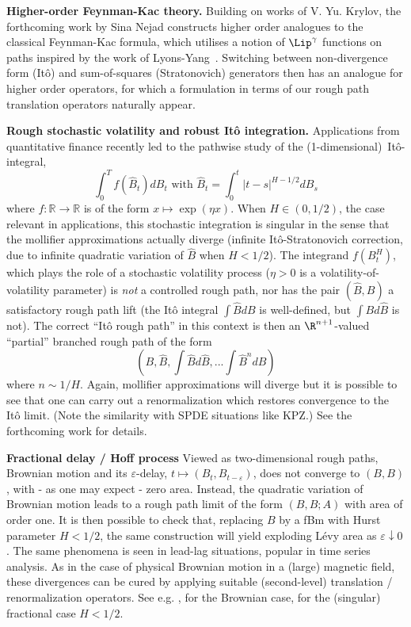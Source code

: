 \documentclass{article}
\begin{document}
\textbf{Higher-order Feynman-Kac theory.} Building on works of V. Yu. Krylov, the forthcoming work by Sina Nejad \cite{NejadForth} constructs higher order analogues to the classical Feynman-Kac formula, which utilises a notion of $\Lip^\gamma$ functions on paths inspired by the work of Lyons-Yang~\cite{LyonsYang16}. Switching between non-divergence form (It{\^o})
and sum-of-squares (Stratonovich) generators then has an analogue for higher
order operators, for which a formulation in terms of our rough path translation
operators naturally appear. 

\textbf{Rough stochastic volatility and robust It{\^o} integration.}
Applications from quantitative finance recently led to the pathwise study of the
(1-dimensional)\ It{\^o}-integral,%
\[
\int_{0}^{T}f (  \hat{B}_{t} ) dB_{t}\text{ with }\hat{B}%
_{t}=\int_{0}^{t}\left\vert t-s\right\vert ^{H-1/2}dB_{s}
\]%
where $f:\mathbb{R}\rightarrow \mathbb{R}$ is of the form $x \mapsto \exp \left( \eta
x \right) $. When $H\in \left( 0,1/2\right) $, the case relevant in applications, this
stochastic integration is singular in the sense that the mollifier approximations
actually diverge (infinite It{\^o}-Stratonovich correction, due to infinite
quadratic variation of $\hat{B}$ when $H<1/2$).  The integrand $f( B_{t}^{H} )$, which plays the role of a stochastic volatility process ($\eta >0$ is a volatility-of-volatility parameter)
is {\it not} a controlled rough path, nor has the pair $(\hat B,B)$ a satisfactory rough path lift
(the It\^o integral $\int \hat B dB$ is well-defined, but $\int B d \hat B$ is not). The correct ``It\^o rough
path'' in this context is then an $\R^{n+1}$-valued ``partial'' branched rough path of the form 
\[
\left( B,\hat{B},\int \hat{B}d\hat{B},...\int \hat{B}^{n}dB\right) 
\]%
where $n \sim 1/H$. Again, mollifier approximations will diverge but
it is possible to see that one can carry out a renormalization which restores
convergence to the It\^o limit. (Note the similarity with SPDE situations like KPZ.) %
See the forthcoming work \cite{BFGMSForth} for details.

\bigskip \textbf{Fractional delay / Hoff process }Viewed as two-dimensional
rough paths, Brownian motion and its $\varepsilon $-delay, $t\mapsto
(B_{t},B_{t-\varepsilon })$, does not converge to $\left( B,B\right) $, with
- as one may expect - zero area. Instead, the quadratic variation of
Brownian motion leads to a rough path limit of the form $\left( B,B;A\right) 
$ with area of order one. It is then possible
to check that, replacing $B$ by a fBm with Hurst parameter $H<1/2$, the same
construction will yield exploding L\'{e}vy area as $\varepsilon \downarrow 0$. 
The same phenomena is seen in lead-lag situations, popular in time series
analysis. As in the case of physical Brownian motion in a (large) magnetic
field, these divergences can be cured by applying suitable (second-level)
translation / renormalization operators. See e.g. \cite[Ch.13]{FrizVictoir10}, \cite{Flint16} for the Brownian case,
\cite{BCFForth} for the (singular) fractional case $H<1/2$.
\end{document}

